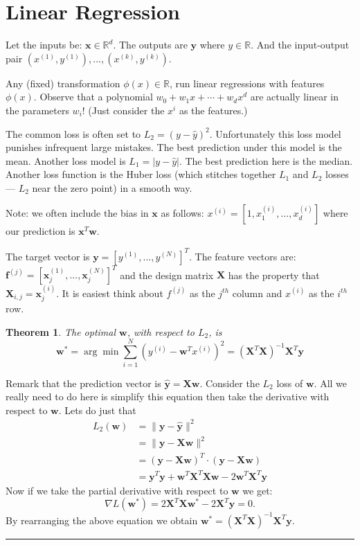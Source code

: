 \documentclass[twoside]{article}
\newcounter{lecnum}
\newtheorem{theorem}{Theorem}[lecnum]
\newenvironment{proof}{{\bf Proof:}}{\hfill\rule{2mm}{2mm}}
\newcommand\R{\mathbb{R}}
\begin{document}
\section{Linear Regression}
Let the inputs be: $\mathbf{x} \in \R^d$. The outputs are $\mathbf{y}$ where $y \in \R$. And the input-output pair $(x^{(1)}, y^{(1)}), ..., (x^{(k)}, y^{(k)})$.

Any (fixed) transformation $\phi(x) \in \R$, run linear regressions with features $\phi(x)$. Observe that a polynomial $w_0 + w_1x + \cdots + w_d x^d$ are actually linear in the parameters $w_i$! (Just consider the $x^i$ as the features.)

The common loss is often set to $L_2 = (y - \hat{y})^2$. Unfortunately this loss model punishes infrequent large mistakes. The best prediction under this model is the mean. Another loss model is $L_1 = |y - \hat{y}|$. The best prediction here is the median. Another loss function is the Huber loss (which stitches together $L_1$ and $L_2$ losses --- $L_2$ near the zero point) in a smooth way.

Note: we often include the bias in $\mathbf{x}$ as follows: $x^{(i)} = [1, x^{(i)}_1, ..., x^{(i)}_d]$ where our prediction is $\mathbf{x}^T\mathbf{w}$. 

The target vector is $\mathbf{y} = [y^{(1)}, ..., y^{(N)}]^T$. The feature vectors are: $\mathbf{f}^{(j)} = [\mathbf{x}^{(1)}_j, ..., \mathbf{x}^{(N)}_j]^T$ and the design matrix $\mathbf{X}$ has the property that $\mathbf{X}_{i,j} = \mathbf{x}^(i)_j$. It is easiest think about $f^{(j)}$ as the $j^{th}$ column and $x^{(i)}$ as the $i^{th}$ row. 

\begin{theorem}
The optimal $\mathbf{w}$, with respect to $L_2$, is 
\[\mathbf{w}^* = \arg\min \sum_{i=1}^{N} \left( y^{(i)} - \mathbf{w}^Tx^{(i)} \right)^2 = (\mathbf{X}^T\mathbf{X})^{-1} \mathbf{X}^T \mathbf{y}\]
\end{theorem}
\begin{proof}
Remark that the prediction vector is $\mathbf{\hat{y}} = \mathbf{Xw}$. Consider the $L_2$ loss of $\mathbf{w}$. All we really need to do here is simplify this equation then take the derivative with respect to $\mathbf{w}$. Lets do just that 
\begin{align*}
L_2(\mathbf{w}) &= \parallel \mathbf{y} - \mathbf{\hat{y}}\parallel^2 \\
&= \parallel \mathbf{y} - \mathbf{Xw} \parallel^2 \\
&= (\mathbf{y} - \mathbf{Xw})^T \cdot (\mathbf{y} - \mathbf{Xw}) \\
&= \mathbf{y}^T\mathbf{y} + \mathbf{w}^T\mathbf{X}^T\mathbf{Xw} - 2\mathbf{w}^T\mathbf{X}^T\mathbf{y}
\end{align*}
Now if we take the partial derivative with respect to $\mathbf{w}$ we get:
\[\nabla L(\mathbf{w}^*) = 2\mathbf{X}^T\mathbf{X}\mathbf{w}^* - 2\mathbf{X}^T\mathbf{y} = 0.\]
By rearranging the above equation we obtain $\mathbf{w}^* = \left( \mathbf{X}^T\mathbf{X} \right)^{-1}\mathbf{X}^T\mathbf{y}$. 
\end{proof}
\end{document}
